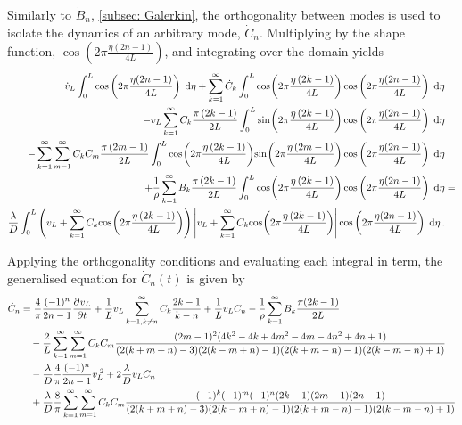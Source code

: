 Similarly to $\dot{B}_n$, \cref{subsec: Galerkin}, the orthogonality between modes is used to isolate the dynamics of an arbitrary mode, $\dot{C}_n$. Multiplying by the shape function, $\cos\left(2\pi\frac{\eta(2n-1)}{4L}\right)$, and integrating over the domain yields
~
\begin{equation*}
\begin{split}
    \dot{v}_L \int^L_0 \cos\left(2\pi\frac{\eta(2n-1)}{4L}\right) \Idx{\eta}
    + \sum_{k=1}^{\infty} \dot{C}_k \int^L_0 \fun{cos}{2\pi \frac{\eta \left( 2 k - 1 \right)}{4L}} \cos\left(2\pi\frac{\eta(2n-1)}{4L}\right) \Idx{\eta}
    & \\ %
    - v_L \sum_{k=1}^{\infty} C_k \frac{\pi \left( 2 k - 1 \right)}{2L} \int^L_0 \fun{sin}{2\pi \frac{\eta \left( 2 k - 1 \right)}{4L}} \cos\left(2\pi\frac{\eta(2n-1)}{4L}\right) \Idx{\eta}
    & \\ %
    - \sum_{k=1}^{\infty} \sum_{m=1}^{\infty} C_k C_m \frac{\pi \left( 2 m - 1 \right)}{2L} \int^L_0 \fun{cos}{2\pi \frac{\eta \left( 2 k - 1 \right)}{4L}} \fun{sin}{2\pi \frac{\eta \left( 2 m - 1 \right)}{4L}} \cos\left(2\pi\frac{\eta(2n-1)}{4L}\right) \Idx{\eta}
    & \\ %
    + \frac{1}{\rho} \sum_{k=1}^{\infty} B_k \frac{\pi \left( 2 k - 1 \right)}{2L} \int^L_0 \fun{cos}{2\pi \frac{\eta \left( 2 k - 1 \right)}{4L}} \cos\left(2\pi\frac{\eta(2n-1)}{4L}\right) \Idx{\eta}
    &= \\ %
    \frac{\lambda}{D} \int^L_0 \left( v_L + \sum_{k=1}^{\infty} C_k \fun{cos}{2\pi \frac{\eta \left( 2 k - 1 \right)}{4L}} \right) \left| v_L + \sum_{k=1}^{\infty} C_k \fun{cos}{2\pi \frac{\eta \left( 2 k - 1 \right)}{4L}} \right| \cos\left(2\pi\frac{\eta(2n-1)}{4L}\right) \Idx{\eta} \, .
\end{split}
\end{equation*}

Applying the orthogonality conditions and evaluating each integral in term, the generalised equation for $\dot{C}_n(t)$ is given by
~
\begin{equation*}
\begin{split}
    \dot{C}_n &=
    \frac{4}{\pi} \frac{(-1)^n}{2n-1} \pdiff{v_L}{t}
    + \frac{1}{L} v_L \sum^{\infty}_{k=1,k \neq n} C_k \frac{2k-1}{k-n}
    + \frac{1}{L} v_L C_n
    - \frac{1}{\rho} \sum^{\infty}_{k=1} B_k \frac{\pi (2k-1)}{2L}
    \\ & \quad %
    - \frac{2}{L} \sum^{\infty}_{k=1} \sum^{\infty}_{m=1} C_k C_m \frac{
    (2m-1)^2 (4k^2 - 4k + 4m^2 - 4m - 4n^2 + 4n + 1)
    }{
    (2(k+m+n)-3)(2(k-m+n)-1)(2(k+m-n)-1)(2(k-m-n)+1)
    }
    \\ & \quad %
    - \frac{\lambda}{D} \frac{4}{\pi} \frac{(-1)^n}{2n-1} v_L\power{2}
    + 2 \frac{\lambda}{D} v_L C_n
    \\ & \quad %
    + \frac{\lambda}{D} \frac{8}{\pi} \sum^{\infty}_{k=1} \sum^{\infty}_{m=1} C_k C_m \frac{
    (-1)^k (-1)^m (-1)^n (2k-1) (2m-1) (2n-1)
    }{
    (2(k+m+n)-3)(2(k-m+n)-1)(2(k+m-n)-1)(2(k-m-n)+1)
    }
\end{split}
\end{equation*}